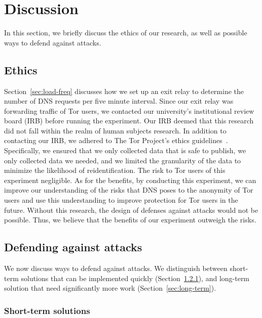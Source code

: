 \section{Discussion}
\label{sec:discussion}

In this section, we briefly discuss the ethics of our research, as well
as possible ways to defend against \name attacks.

\subsection{Ethics}
\label{sec:ethics}

Section~\ref{sec:load-freq} discusses how we set up an exit relay to
determine the number of DNS requests per five minute interval.  Since
our exit relay was forwarding traffic of Tor users, we contacted our
university's institutional review board (IRB) before running the
experiment.  Our IRB deemed that this research did not fall within the
realm of human subjects research.  In addition to contacting our IRB, we
adhered to The Tor Project's ethics guidelines~\cite{ethics-guidelines}.
Specifically, \first we ensured that we only collected data that is safe
to publish, \second we only collected data we needed, and \third we
limited the granularity of the data to minimize the likelihood of
reidentification.  The risk to Tor users of this experiment negligible.
As for the benefits, by conducting this experiment, we can improve our
understanding of the risks that DNS poses to the anonymity of Tor users
and use this understanding to improve protection for Tor users in the
future. Without this research, the design of defenses against \name
attacks would not be possible.  Thus, we believe that the benefits of
our experiment outweigh the risks.

\subsection{Defending against \name attacks}

We now discuss ways to defend against \name attacks.  We distinguish
between short-term solutions that can be implemented quickly
(Section~\ref{sec:short-term}), and long-term solution that need significantly more
work (Section~\ref{sec:long-term}).

\subsubsection{Short-term solutions}
\label{sec:short-term}

